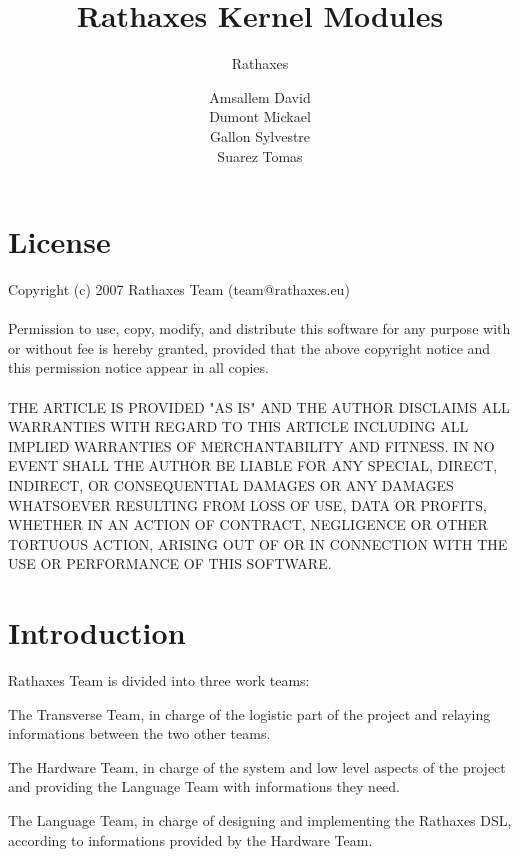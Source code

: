 \documentclass[11pt]{report}
\begin{document}
\author{Rathaxes}
\author{Amsallem David\\Dumont Mickael\\Gallon Sylvestre\\Suarez Tomas}
\title{Rathaxes Kernel Modules}
\maketitle

\section*{License}
Copyright (c) 2007 Rathaxes Team (team@rathaxes.eu)
\\\\
Permission to use, copy, modify, and distribute this software for any
purpose with or without fee is hereby granted, provided that the above
copyright notice and this permission notice appear in all copies.
\\\\
THE ARTICLE IS PROVIDED "AS IS" AND THE AUTHOR DISCLAIMS ALL WARRANTIES
WITH REGARD TO THIS ARTICLE INCLUDING ALL IMPLIED WARRANTIES OF
MERCHANTABILITY AND FITNESS. IN NO EVENT SHALL THE AUTHOR BE LIABLE FOR
ANY SPECIAL, DIRECT, INDIRECT, OR CONSEQUENTIAL DAMAGES OR ANY DAMAGES
WHATSOEVER RESULTING FROM LOSS OF USE, DATA OR PROFITS, WHETHER IN AN
ACTION OF CONTRACT, NEGLIGENCE OR OTHER TORTUOUS ACTION, ARISING OUT OF
OR IN CONNECTION WITH THE USE OR PERFORMANCE OF THIS SOFTWARE.
\newpage

\section*{Introduction}

Rathaxes Team is divided into three work teams:\\
\begin{description}
  \item{The Transverse Team, in charge of the logistic part of the project and
    relaying informations between the two other teams.}
  \item{The Hardware Team, in charge of the system and low level aspects of the
    project and providing the Language Team with informations they need.}
  \item{The Language Team, in charge of designing and implementing the Rathaxes
    DSL, according to informations provided by the Hardware Team.\\}
\end{description}
\end{document}
